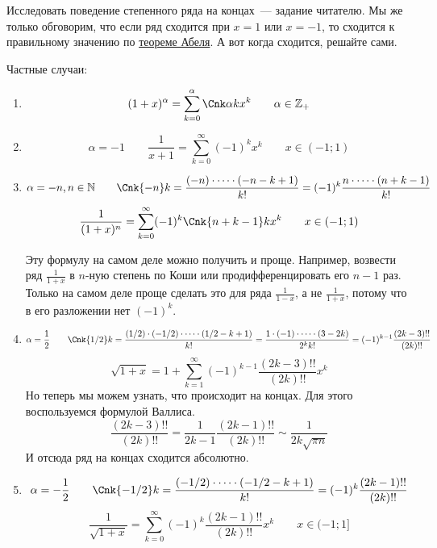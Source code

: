 \documentclass{article}
\begin{document}
    \begin{remark}
        Исследовать поведение степенного ряда на концах~--- задание читателю. Мы же только обговорим, что если ряд сходится при $x=1$ или $x=-1$, то сходится к правильному значению по \hyperref[Теорема Абеля о степенных рядах]{теореме Абеля}. А вот когда сходится, решайте сами.
    \end{remark}
    \begin{remark}
        Частные случаи:
        \begin{enumerate}
            \addtocounter{enumi}{-1}
            \item $$
            (1+x)^\alpha=\sum\limits_{k=0}^\alpha\Cnk \alpha kx^k\qquad\alpha\in\mathbb Z_+
            $$
            \item $$
            \alpha=-1\qquad\frac1{x+1}=\sum\limits_{k=0}^\infty(-1)^kx^k\qquad x\in(-1;1)
            $$
            \item $$
            \alpha=-n,n\in\mathbb N\qquad\Cnk{-n}k=\frac{(-n)\cdot\cdots\cdot(-n-k+1)}{k!}=(-1)^k\frac{n\cdot\cdots\cdot(n+k-1)}{k!}
            $$
            $$
            \frac1{(1+x)^n}=\sum\limits_{k=0}^\infty(-1)^k\Cnk{n+k-1}kx^k\qquad x\in(-1;1)
            $$
            \begin{remark}
                Эту формулу на самом деле можно получить и проще. Например, возвести ряд $\frac1{1+x}$ в $n$-ную степень по Коши или продифференцировать его $n-1$ раз.\\
                Только на самом деле проще сделать это для ряда $\frac1{1-x}$, а не $\frac1{1+x}$, потому что в его разложении нет $(-1)^k$.
            \end{remark}
            \item $$
            \alpha=\frac12\qquad\Cnk{1/2}k=\frac{(1/2)\cdot(-1/2)\cdot\cdots\cdot(1/2-k+1)}{k!}=\frac{1\cdot(-1)\cdot\cdots\cdot(3-2k)}{2^kk!}=(-1)^{k-1}\frac{(2k-3)!!}{(2k)!!}
            $$
            $$
            \sqrt{1+x}=1+\sum\limits_{k=1}^\infty(-1)^{k-1}\frac{(2k-3)!!}{(2k)!!}x^k
            $$
            Но теперь мы можем узнать, что происходит на концах. Для этого воспользуемся формулой Валлиса.
            $$
            \frac{(2k-3)!!}{(2k)!!}=\frac1{2k-1}\frac{(2k-1)!!}{(2k)!!}\sim\frac1{2k\sqrt{\pi n}}
            $$
            И отсюда ряд на концах сходится абсолютно.
            \item $$
            \alpha=-\frac12\qquad\Cnk{-1/2}k=\frac{(-1/2)\cdot\cdots\cdot(-1/2-k+1)}{k!}=(-1)^k\frac{(2k-1)!!}{(2k)!!}
            $$
            $$
            \frac1{\sqrt{1+x}}=\sum\limits_{k=0}^\infty(-1)^k\frac{(2k-1)!!}{(2k)!!}x^k\qquad x\in(-1;1]
            $$
        \end{enumerate}
    \end{remark}
\end{document}
